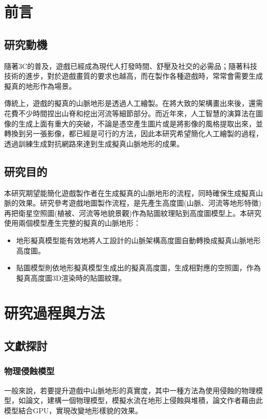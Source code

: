 \documentclass[a4paper, 12pt]{article}
\begin{document}
\section{前言}
\subsection{研究動機}
隨著3C的普及，遊戲已經成為現代人打發時間、舒壓及社交的必需品；隨著科技技術的進步，對於遊戲畫質的要求也越高，而在製作各種遊戲時，常常會需要生成擬真的地形作為場景。

傳統上，遊戲的擬真的山脈地形是透過人工繪製。在將大致的架構畫出來後，還需花費不少時間捏出山脊和挖出河流等細節部分。而近年來，人工智慧的演算法在圖像的生成上面有重大的突破，不論是憑空產生圖片或是將影像的風格提取出來，並轉換到另一張影像，都已經是可行的方法，因此本研究希望簡化人工繪製的過程，透過訓練生成對抗網路來達到生成擬真山脈地形的成果。

\subsection{研究目的}
本研究期望能簡化遊戲製作者在生成擬真的山脈地形的流程，同時確保生成擬真山脈的效果。研究參考遊戲地圖製作流程，是先產生高度圖(山脈、河流等地形特徵)再把衛星空照圖(植被、河流等地貌景觀)作為貼圖紋理貼到高度圖模型上。本研究使用兩個模型產生完整的擬真的山脈地形：

\begin{itemize}
    \item 地形擬真模型能有效地將人工設計的山脈架構高度圖自動轉換成擬真山脈地形高度圖。
    \item 貼圖模型則依地形擬真模型生成出的擬真高度圖，生成相對應的空照圖，作為擬真高度圖3D渲染時的貼圖紋理。
\end{itemize}

\section{研究過程與方法}
\subsection{文獻探討}
\subsubsection{物理侵蝕模型}
一般來說，若要提升遊戲中山脈地形的真實度，其中一種方法為使用侵蝕的物理模型，如論文\cite{jako2011fast}，建構一個物理模型，模擬水流在地形上侵蝕與堆積，論文作者藉由此模型結合GPU，實現改變地形樣貌的效果。
\end{document}
